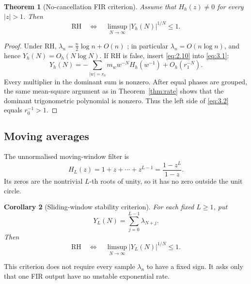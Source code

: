 \documentclass[11pt]{amsart}
\numberwithin{equation}{section}
\newtheorem{theorem}{Theorem}[section]
\newtheorem{corollary}[theorem]{Corollary}
\theoremstyle{definition}
\theoremstyle{remark}
\newcommand{\RH}{\mathrm{RH}}
\begin{document}
\begin{theorem}[No-cancellation FIR criterion]
\label{thm:fir-general}
Assume that \(H_h(z)\ne0\) for every \(|z|>1\). Then
\begin{equation}
 \RH\quad\Longleftrightarrow\quad
 \limsup_{N\to\infty}|Y_h(N)|^{1/N}\le1.                 \label{eq:3.2}
\end{equation}
\end{theorem}

\begin{proof}
Under RH, \(\lambda_n=\frac n2\log n+O(n)\)
\cite[Thm.~6.1]{Lagarias}; in particular \(\lambda_n=O(n\log n)\),
and hence \(Y_h(N)=O_h(N\log N)\). If RH is false, insert
\eqref{eq:2.10} into \eqref{eq:3.1}:
\begin{equation}
 Y_h(N)
 =-\sum_{|w|=r_0}m_ww^{-N}H_h(w^{-1})+O_h(r_1^{-N}).
                                                        \label{eq:3.3}
\end{equation}
Every multiplier in the dominant sum is nonzero. After equal phases are
grouped, the same mean-square argument as in Theorem~\ref{thm:rate} shows
that the dominant trigonometric polynomial is nonzero. Thus the left side
of \eqref{eq:3.2} equals \(r_0^{-1}>1\).
\end{proof}

\subsection{Moving averages}

The unnormalised moving-window filter is
\begin{equation}
 H_L(z)=1+z+\cdots+z^{L-1}=\frac{1-z^L}{1-z}.            \label{eq:3.4}
\end{equation}
Its zeros are the nontrivial \(L\)-th roots of unity, so it has no zero
outside the unit circle.

\begin{corollary}[Sliding-window stability criterion]
\label{cor:window-stability}
For each fixed \(L\ge1\), put
\begin{equation}
 Y_L(N)=\sum_{j=0}^{L-1}\lambda_{N+j}.                   \label{eq:3.5}
\end{equation}
Then
\begin{equation}
 \boxed{\RH\quad\Longleftrightarrow\quad
 \limsup_{N\to\infty}|Y_L(N)|^{1/N}\le1.}                \label{eq:3.6}
\end{equation}
\end{corollary}

This criterion does not require every sample \(\lambda_n\) to have a fixed
sign. It asks only that one FIR output have no unstable exponential rate.
\end{document}
